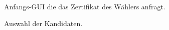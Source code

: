 \documentclass[parskip=full,11pt,twoside]{scrartcl}
\begin{document}
\begin{figure}[hb]
	\caption{\label{fig:whlr-start}
		Anfangs-GUI die das Zertifikat des Wählers anfragt.
	}
\end{figure}

\begin{figure}[hb]
	\caption{\label{fig:whlr-wahl}
		Auswahl der Kandidaten.
	}
\end{figure}
\end{document}
